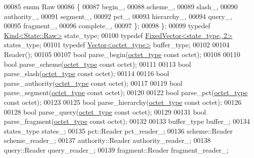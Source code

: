 \begin{DoxyCode}
00085         \textcolor{keyword}{enum} Raw
00086         \{
00087             begin\_,
00088             scheme\_,
00089             slash\_,
00090             authority\_,
00091             segment\_,
00092             pct\_,
00093             hierarchy\_,
00094             query\_,
00095             fragment\_,
00096             complete\_,
00097         \};
00098     \};
00099     \textcolor{keyword}{typedef} \hyperlink{classhryky_1_1_kind}{Kind<State::Raw>}            state\_type;
00100     \textcolor{keyword}{typedef} \hyperlink{classhryky_1_1_fixed_vector}{FixedVector<state_type, 2>}  states\_type;
00101     \textcolor{keyword}{typedef} \hyperlink{classhryky_1_1_vector}{Vector<octet_type>}          buffer\_type;
00102 
00104     Reader();
00105 
00107     \textcolor{keywordtype}{bool} parse\_begin(\hyperlink{namespacehryky_a488cba8b666be33ccca70e819684e3c8}{octet_type} \textcolor{keyword}{const} octet);
00108 
00110     \textcolor{keywordtype}{bool} parse\_scheme(\hyperlink{namespacehryky_a488cba8b666be33ccca70e819684e3c8}{octet_type} \textcolor{keyword}{const} octet);
00111 
00113     \textcolor{keywordtype}{bool} parse\_slash(\hyperlink{namespacehryky_a488cba8b666be33ccca70e819684e3c8}{octet_type} \textcolor{keyword}{const} octet);
00114 
00116     \textcolor{keywordtype}{bool} parse\_authority(\hyperlink{namespacehryky_a488cba8b666be33ccca70e819684e3c8}{octet_type} \textcolor{keyword}{const} octet);
00117 
00119     \textcolor{keywordtype}{bool} parse\_segment(\hyperlink{namespacehryky_a488cba8b666be33ccca70e819684e3c8}{octet_type} \textcolor{keyword}{const} octet);
00120 
00122     \textcolor{keywordtype}{bool} parse\_pct(\hyperlink{namespacehryky_a488cba8b666be33ccca70e819684e3c8}{octet_type} \textcolor{keyword}{const} octet);
00123 
00125     \textcolor{keywordtype}{bool} parse\_hierarchy(\hyperlink{namespacehryky_a488cba8b666be33ccca70e819684e3c8}{octet_type} \textcolor{keyword}{const} octet);
00126 
00128     \textcolor{keywordtype}{bool} parse\_query(\hyperlink{namespacehryky_a488cba8b666be33ccca70e819684e3c8}{octet_type} \textcolor{keyword}{const} octet);
00129 
00131     \textcolor{keywordtype}{bool} parse\_fragment(\hyperlink{namespacehryky_a488cba8b666be33ccca70e819684e3c8}{octet_type} \textcolor{keyword}{const} octet);
00132 
00133     buffer\_type         buffer\_;
00134     states\_type         states\_;
00135     pct::Reader         pct\_reader\_;
00136     scheme::Reader      scheme\_reader\_;
00137     authority::Reader   authority\_reader\_;
00138     query::Reader       query\_reader\_;
00139     fragment::Reader    fragment\_reader\_;

\end{DoxyCode}
